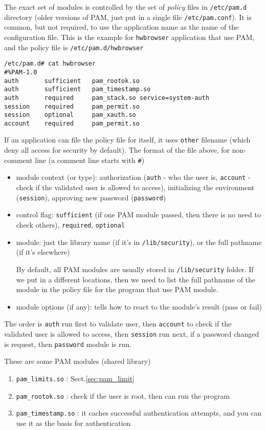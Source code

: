 The exact set of modules is controlled by the set of {\it policy} files in
\verb!/etc/pam.d! directory (older versions of PAM, just put in a single file
\verb!/etc/pam.conf!). It is common, but not required, to use the application
name as the name of the configuration file. This is the example for
\verb!hwbrowser! application that use PAM, and the policy file is
\verb!/etc/pam.d/hwbrowser!
\begin{verbatim}
/etc/pam.d# cat hwbrowser
#%PAM-1.0
auth       sufficient   pam_rootok.so
auth       sufficient   pam_timestamp.so
auth       required     pam_stack.so service=system-auth
session    required     pam_permit.so
session    optional     pam_xauth.so
account    required     pam_permit.so
\end{verbatim}
If an application can file the policy file for itself, it uses \verb!other!
filename (which deny all access for security by default). The format of the file
above, for non-comment line (a comment line starts with \verb!#!)
\begin{itemize}
  \item module context (or type): authorization (\verb!auth! - who the user is,
  \verb!account! - check if the validated user is allowed to access),
  initializing the environment (\verb!session!), approving new password (\verb!password!)
  
  \item control flag: \verb!sufficient! (if one PAM module passed, then there is
  no need to check others), \verb!required!, \verb!optional!
  
  \item module: just the library name (if it's in \verb!/lib/security!), or the
  full pathname (if it's elsewhere)

By default, all PAM modules are usually stored in \verb!/lib/security! folder.
If we put in a different locations, then we need to list the full pathname of
the module in the policy file for the program that use PAM module. 
  
  \item module options (if any): tells how to react to the module's result
  (pass or fail)
\end{itemize}
The order is \verb!auth! run first to validate user, then \verb!account! to
check if the validated user is allowed to access, then \verb!session! run next,
if a password changed is request, then \verb!password! module is run. 

These are some PAM modules (shared library)
\begin{enumerate}
  \item \verb!pam_limits.so! : Sect.\ref{sec:pam_limit}
  \item \verb!pam_rootok.so! : check if the user is root, then can run the
  program
  \item \verb!pam_timestamp.so! : it caches successful authentication attempts,
  and you can use it as the basis for authentication
\end{enumerate}

